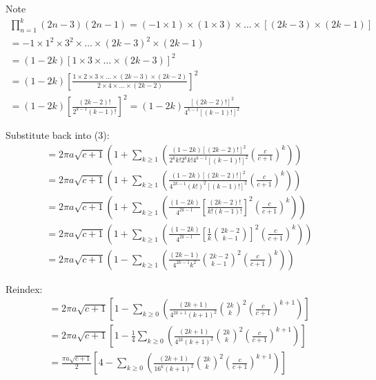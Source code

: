 \documentclass{article}
\begin{document}
Note
\begin{equation}
\begin{split}
	\prod_{n=1}^k(2n-3)(2n-1)
	= (-1 \times 1) \times (1\times 3)\times\dots\times[(2k-3)\times(2k-1)]\\
	= -1 \times 1^2 \times 3^2 \times\dots\times(2k-3)^2 \times (2k-1)\\
	= (1-2k)\left[1\times3\times\dots\times(2k-3)\right]^2\\
	= (1-2k)\left[\frac{1\times2\times3\times\dots\times(2k-3)\times(2k-2)}{2\times4\times\dots\times(2k-2)}\right]^2\\
	= (1-2k)\left[\frac{(2k-2)!}{2^{k-1}(k-1)!}\right]^2
	= (1-2k)\frac{[(2k-2)!]^2}{4^{k-1}[(k-1)!]^2}
\end{split}
\end{equation}

Substitute back into (3):
\begin{equation*}
\begin{split}
	= 2\pi a\sqrt{c+1} \left(1 + 
	\sum_{k\geq 1}\left( \frac{(1-2k)[(2k-2)!]^2}{2^kk!2^kk!4^{k-1}[(k-1)!]^2}\left(\frac{c}{c+1}\right)^k\right)\right)\\
	= 2\pi a\sqrt{c+1} \left(1 + 
	\sum_{k\geq 1}\left( \frac{(1-2k)[(2k-2)!]^2}{4^{2k-1}(k!)^2[(k-1)!]^2}\left(\frac{c}{c+1}\right)^k\right)\right)\\
	= 2\pi a\sqrt{c+1} \left(1 + 
	\sum_{k\geq 1}\left( \frac{(1-2k)}{4^{2k-1}}\left[\frac{(2k-2)!}{k!(k-1)!}\right]^2\left(\frac{c}{c+1}\right)^k\right)\right)\\
	= 2\pi a\sqrt{c+1} \left(1 + 
	\sum_{k\geq 1}\left( \frac{(1-2k)}{4^{2k-1}}\left[\frac{1}{k}{{2k-2}\choose{k-1}}\right]^2\left(\frac{c}{c+1}\right)^k\right)\right)\\
	= 2\pi a\sqrt{c+1} \left(1 -
	\sum_{k\geq 1}\left( \frac{(2k-1)}{4^{2k-1}k^2}{{2k-2}\choose{k-1}}^2\left(\frac{c}{c+1}\right)^k\right)\right)
\end{split}
\end{equation*}

Reindex:
\begin{equation*}
\begin{split}
	= 2\pi a\sqrt{c+1} \left[1 -
	\sum_{k\geq 0}\left( \frac{(2k+1)}{4^{2k+1}(k+1)^2}{{2k}\choose k}^2\left(\frac{c}{c+1}\right)^{k+1}\right)\right]\\
	= 2\pi a\sqrt{c+1} \left[1 -
	\frac{1}{4}\sum_{k\geq 0}\left( \frac{(2k+1)}{4^{2k}(k+1)^2}{{2k}\choose k}^2\left(\frac{c}{c+1}\right)^{k+1}\right)\right]\\
	= \frac{\pi a\sqrt{c+1}}{2} \left[4 -
	\sum_{k\geq 0}\left( \frac{(2k+1)}{16^k(k+1)^2}{{2k}\choose k}^2\left(\frac{c}{c+1}\right)^{k+1}\right)\right]
\end{split}
\end{equation*}
\end{document}

